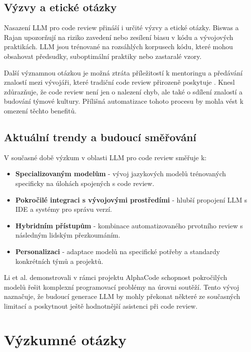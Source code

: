 \documentclass[12pt, a4paper]{article}
\begin{document}
\subsection{Výzvy a etické otázky}

Nasazení LLM pro code review přináší i určité výzvy a etické otázky. Biswas a Rajan \cite{biswas2022} upozorňují na riziko zavedení nebo zesílení biasu v kódu a vývojových praktikách. LLM jsou trénované na rozsáhlých korpusech kódu, které mohou obsahovat předsudky, suboptimální praktiky nebo zastaralé vzory.

Další významnou otázkou je možná ztráta příležitostí k mentoringu a předávání znalostí mezi vývojáři, které tradiční code review přirozeně poskytuje \cite{zdrojak2022}. Knesl zdůrazňuje, že code review není jen o nalezení chyb, ale také o sdílení znalostí a budování týmové kultury. Přílišná automatizace tohoto procesu by mohla vést k omezení těchto benefitů.

\subsection{Aktuální trendy a budoucí směřování}

V současné době výzkum v oblasti LLM pro code review směřuje k:

\begin{itemize}
    \item \textbf{Specializovaným modelům} - vývoj jazykových modelů trénovaných specificky na úlohách spojených s code review.
    \item \textbf{Pokročilé integraci s vývojovými prostředími} - hlubší propojení LLM s IDE a systémy pro správu verzí.
    \item \textbf{Hybridním přístupům} - kombinace automatizovaného prvotního review s následným lidským přezkoumáním.
    \item \textbf{Personalizaci} - adaptace modelů na specifické potřeby a standardy konkrétních týmů a projektů.
\end{itemize}

Li et al. \cite{li2022} demonstrovali v rámci projektu AlphaCode schopnost pokročilých modelů řešit komplexní programovací problémy na úrovni soutěží. Tento vývoj naznačuje, že budoucí generace LLM by mohly překonat některé ze současných limitací a poskytnout ještě hodnotnější asistenci při code review.



\section{Výzkumné otázky}
\end{document}
